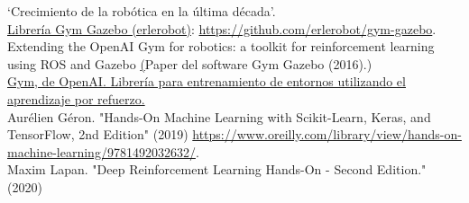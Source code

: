 \begin{thebibliography}{69}
 `Crecimiento de la robótica en la última década'. \href{https://www.interempresas.net/Robotica/Articulos/254914-Crece-un-6-por-ciento-el-numero-de-robots-industriales-instalados-en-todo-el-mundo-en-2018.html}\\

 \href{https://github.com/erlerobot/gym-gazebo}{Librería Gym Gazebo (erlerobot)}: \url{https://github.com/erlerobot/gym-gazebo}.\\

 Extending the OpenAI Gym for robotics: a toolkit for reinforcement learning using ROS and Gazebo \href{https://arxiv.org/pdf/1608.05742.pdf}(Paper del software Gym Gazebo (2016).)\\

 \href{https://gym.openai.com/}{Gym, de OpenAI. Librería para entrenamiento de entornos utilizando el aprendizaje por refuerzo.}\\

 Aurélien Géron. "Hands-On Machine Learning with Scikit-Learn, Keras, and TensorFlow, 2nd Edition" (2019) \url{https://www.oreilly.com/library/view/hands-on-machine-learning/9781492032632/}.\\

 Maxim Lapan. "Deep Reinforcement Learning Hands-On - Second Edition." (2020) \\

\end{thebibliography}
